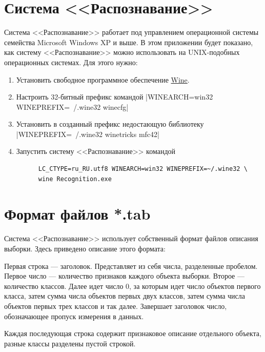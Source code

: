 \documentclass[12pt]{article}
\begin{document}
\newpage
\appendix
\section{Система <<Распознавание>>}
Система <<Распознавание>> \cite{recognition06} работает под
управлением операционной системы семейства Microsoft Windows XP и
выше. В этом приложении будет показано, как систему <<Распознавание>>
можно использовать на UNIX-подобных операционных системах. Для этого
нужно:

\begin{enumerate}
  \item Установить свободное программное обеспечение
    \href{https://www.winehq.org/}{Wine}.
  \item Настроить 32-битный префикс командой
    |WINEARCH=win32 WINEPREFIX=~/.wine32 winecfg|
  \item Установить в созданный префикс недостающую библиотеку
    |WINEPREFIX=~/.wine32 winetricks mfc42|
  \item Запустить систему <<Распознавание>> командой
    \begin{verbatim}
      LC_CTYPE=ru_RU.utf8 WINEARCH=win32 WINEPREFIX=~/.wine32 \
      wine Recognition.exe
    \end{verbatim}
\end{enumerate}

\section{Формат файлов *.tab}

Система <<Распознавание>> \cite{recognition06} использует собственный
формат файлов описания выборки. Здесь приведено описание этого
формата:

Первая строка --- заголовок. Представляет из себя числа, разделенные
пробелом. Первое число --- количество признаков каждого объекта
выборки. Второе --- количество классов. Далее идет число \(0\), за
которым идет число объектов первого класса, затем сумма числа объектов
первых двух классов, затем сумма числа объектов первых трех классов и
так далее. Завершает заголовок число, обозначающее пропуск измерения в
данных.

Каждая последующая строка содержит признаковое описание отдельного
объекта, разные классы разделены пустой строкой.

\printbibliography
\end{document}
